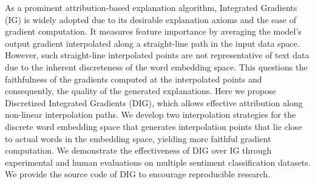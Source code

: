 As a prominent attribution-based explanation algorithm, Integrated Gradients (IG) is widely adopted due to its desirable explanation axioms and the ease of gradient computation. It measures feature importance by averaging the model's output gradient interpolated along a straight-line path in the input data space. However, such straight-line interpolated points are not representative of text data due to the inherent discreteness of the word embedding space. This questions the faithfulness of the gradients computed at the interpolated points and consequently, the quality of the generated explanations. Here we propose Discretized Integrated Gradients (DIG), which allows effective attribution along non-linear interpolation paths. We develop two interpolation strategies for the discrete word embedding space that generates interpolation points that lie close to actual words in the embedding space, yielding more faithful gradient computation. We demonstrate the effectiveness of DIG over IG through experimental and human evaluations on multiple sentiment classification datasets. We provide the source code of DIG to encourage reproducible research.
